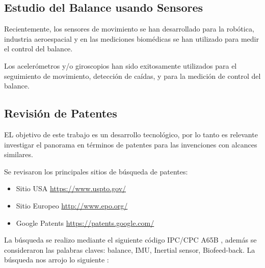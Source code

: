 \documentclass[12pt,a4paper]{article}
\begin{document}
\subsection{Estudio del Balance usando Sensores}
Recientemente, los sensores de movimiento se han desarrollado para la robótica, industria aeroespacial y en las mediciones biomédicas se han utilizado para medir el control del balance\cite{mancini_relevance_2010}.

Los acelerómetros y/o giroscopios han sido exitosamente utilizados \cite{mancini_relevance_2010} para el seguimiento de movimiento,  detección de caídas, y para la medición de control del balance.

\newpage
\subsection{Revisión de Patentes}
EL objetivo de este trabajo es un desarrollo tecnológico, por lo tanto es relevante investigar el panorama en términos de patentes para las invenciones con alcances similares.

Se revisaron los principales sitios de búsqueda de patentes:
\begin{itemize}
	\item Sitio USA \url{https://www.uspto.gov/}
	\item Sitio Europeo \url{http://www.epo.org/}
	\item Google Patents  \url{https://patents.google.com/}
\end{itemize}
La búsqueda se realizo mediante el siguiente código IPC/CPC  A65B \cite{patentes}, además se consideraron las palabras claves: balance, IMU, Inertial sensor, Biofeed-back. 
La búsqueda nos arrojo lo siguiente : 
\end{document}
